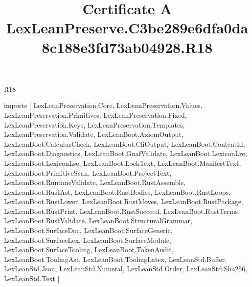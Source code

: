 \begin{lexlean}{R18}
\title{Certificate A LexLeanPreserve.C3be289e6dfa0da8c188e3fd73ab04928.R18}
\begin{coremodule}
imports [
  LexLeanPreservation.Core,
  LexLeanPreservation.Values,
  LexLeanPreservation.Primitives,
  LexLeanPreservation.Fixed,
  LexLeanPreservation.Keys,
  LexLeanPreservation.Templates,
  LexLeanPreservation.Validate,
  LexLeanBoot.AxiomOutput,
  LexLeanBoot.CalculusCheck,
  LexLeanBoot.CliOutput,
  LexLeanBoot.ContentId,
  LexLeanBoot.Diagnostics,
  LexLeanBoot.GnafValidate,
  LexLeanBoot.LexiconLre,
  LexLeanBoot.LexiconLse,
  LexLeanBoot.LockText,
  LexLeanBoot.ManifestText,
  LexLeanBoot.PrimitiveScan,
  LexLeanBoot.ProjectText,
  LexLeanBoot.RuntimeValidate,
  LexLeanBoot.RustAssemble,
  LexLeanBoot.RustAst,
  LexLeanBoot.RustBodies,
  LexLeanBoot.RustLoops,
  LexLeanBoot.RustLower,
  LexLeanBoot.RustMoves,
  LexLeanBoot.RustPackage,
  LexLeanBoot.RustPrint,
  LexLeanBoot.RustSucceed,
  LexLeanBoot.RustTerms,
  LexLeanBoot.RustValidate,
  LexLeanBoot.StructuralGrammar,
  LexLeanBoot.SurfaceDoc,
  LexLeanBoot.SurfaceGeneric,
  LexLeanBoot.SurfaceLex,
  LexLeanBoot.SurfaceModule,
  LexLeanBoot.SurfaceTooling,
  LexLeanBoot.TokenAudit,
  LexLeanBoot.ToolingAst,
  LexLeanBoot.ToolingLatex,
  LexLeanStd.Buffer,
  LexLeanStd.Json,
  LexLeanStd.Numeral,
  LexLeanStd.Order,
  LexLeanStd.Sha256,
  LexLeanStd.Text
]


\end{coremodule}
\end{lexlean}
